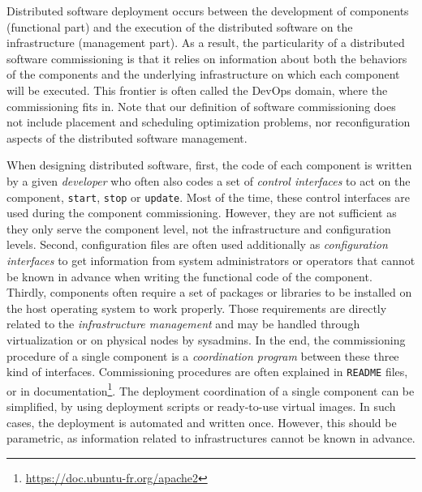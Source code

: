 Distributed software deployment occurs between the development of components (functional part) and the execution of the distributed software on the infrastructure (management part). As a result, the particularity of a distributed software commissioning is that it relies on information about both the behaviors of the components and the underlying infrastructure on which each component will be executed. This frontier is often called the DevOps domain, where the commissioning fits in. Note that our definition of software commissioning does not include placement and scheduling optimization problems, nor reconfiguration aspects of the distributed software management.

When designing distributed software, first, the code of each component is written by a given \emph{developer} who often also codes a set of \emph{control interfaces} to act on the component, \eg \texttt{start}, \texttt{stop} or \texttt{update}. Most of the time, these control interfaces are used during the component commissioning. However, they are not sufficient as they only serve the component level, not the infrastructure and configuration levels. Second, configuration files are often used additionally as \emph{configuration interfaces} to get information from system administrators or operators that cannot be known in advance when writing the functional code of the component. Thirdly, components often require a set of packages or libraries to be installed on the host operating system to work properly. Those requirements are directly related to the \emph{infrastructure management} and may be handled through virtualization or on physical nodes by sysadmins.
%
In the end, the commissioning procedure of a single component is a \emph{coordination program} between these three kind of interfaces. Commissioning
procedures are often explained in \texttt{README} files, or in documentation\footnote{\url{https://doc.ubuntu-fr.org/apache2}}. The deployment coordination of a single component can be simplified, \eg by using deployment scripts or ready-to-use virtual images. In such cases, the deployment is automated and written once. However, this should be parametric, as information related to infrastructures cannot be known in advance.

